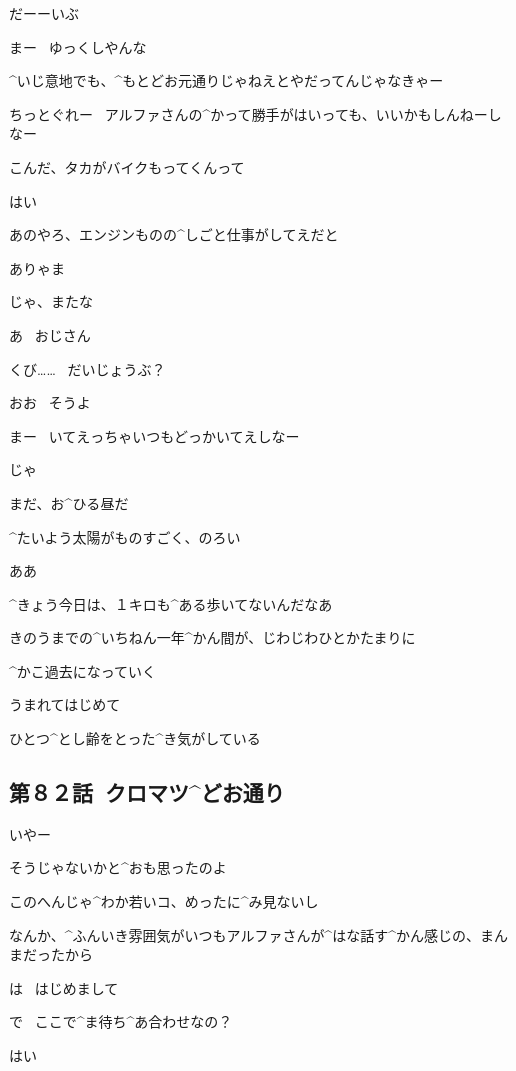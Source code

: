 \Alpha だーーいぶ

\Ojisan まー
\ ゆっくしやんな

\Ojisan ^{いじ}{意地}でも、^{もとどお}{元通}りじゃねえとやだってんじゃなきゃー

\Ojisan ちっとぐれー
\ アルファさんの^{かって}{勝手}がはいっても、いいかもしんねーしなー

\page[64]
\Ojisan こんだ、タカがバイクもってくんって

\Alpha はい

\Ojisan あのやろ、エンジンものの^{しごと}{仕事}がしてえだと

\Alpha ありゃま

\Ojisan じゃ、またな

\Alpha あ
\ おじさん

\page[65]
\Alpha くび……
\ だいじょうぶ？

\Ojisan おお
\ そうよ

\Ojisan まー
\ いてえっちゃいつもどっかいてえしなー

\Ojisan じゃ

\page[67]
\Alpha まだ、お^{ひる}{昼}だ

\Alpha ^{たいよう}{太陽}がものすごく、のろい

\Alpha ああ

\Alpha ^{きょう}{今日}は、１キロも^{ある}{歩}いてないんだなあ

\page[68]
\Alpha きのうまでの^{いちねん}{一年}^{かん}{間}が、じわじわひとかたまりに

\Alpha ^{かこ}{過去}になっていく

\Alpha うまれてはじめて

\Alpha ひとつ^{とし}{齢}をとった^{き}{気}がしている


\subsection{第８２話\ クロマツ^{どお}{通}り}

\page[73]
\Sensei いやー

\Sensei そうじゃないかと^{おも}{思}ったのよ

\Sensei このへんじゃ^{わか}{若}いコ、めったに^{み}{見}ないし

\Sensei なんか、^{ふんいき}{雰囲気}がいつもアルファさんが^{はな}{話}す^{かん}{感}じの、まんまだったから

\Kokone は
\ はじめまして

\page[74]
\Sensei で
\ ここで^{ま}{待}ち^{あ}{合}わせなの？

\Kokone はい

